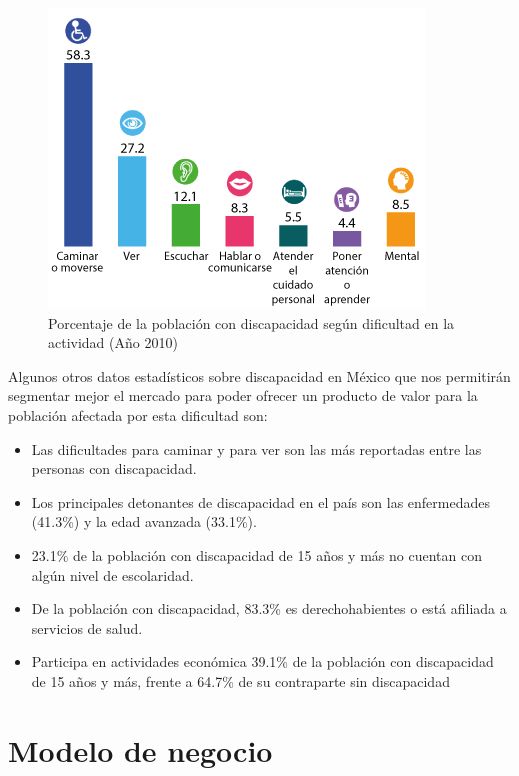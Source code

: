 \begin{figure}[th]
	\centering
	\includegraphics[width=.8\textwidth]{Figures/dificultad.png}
	\decoRule
	\caption{Porcentaje de la poblaci\'on con discapacidad seg\'un dificultad en la actividad (Año 2010) \parencite{discapacidad}}
    \label{fig:dificultad}
\end{figure}

Algunos otros datos estad\'isticos sobre discapacidad en M\'exico que nos permitir\'an segmentar mejor el mercado para poder ofrecer un producto de valor para la poblaci\'on afectada por esta dificultad son:

\begin{itemize}
\item Las dificultades para caminar y para ver son las m\'as reportadas entre las personas con discapacidad.
\item Los principales detonantes de discapacidad en el pa\'is son las enfermedades (41.3\%) y la edad avanzada (33.1\%).
\item 23.1\% de la poblaci\'on con discapacidad de 15 años y m\'as no cuentan con alg\'un nivel de escolaridad.
\item De la poblaci\'on con discapacidad, 83.3\% es derechohabientes o est\'a afiliada a servicios de salud.
\item Participa en actividades económica 39.1\% de la poblaci\'on con discapacidad de 15 años y más, frente a 64.7\% de su contraparte sin discapacidad
\end{itemize}


\section{Modelo de negocio}

